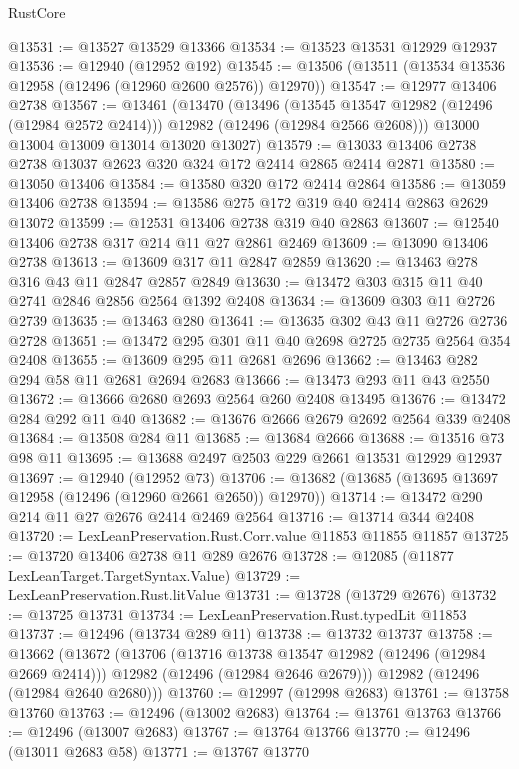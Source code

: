 \begin{lexlean}{RustCore}
\begin{coremodule}
@13531 := @13527 @13529 @13366
@13534 := @13523 @13531 @12929 @12937
@13536 := @12940 (@12952 @192)
@13545 := @13506 (@13511 (@13534 @13536 @12958 (@12496 (@12960 @2600 @2576)) @12970))
@13547 := @12977 @13406 @2738
@13567 := @13461
    (@13470
      (@13496
        (@13545 @13547 @12982 (@12496 (@12984 @2572 @2414)))
        @12982
        (@12496 (@12984 @2566 @2608)))
      @13000
      @13004
      @13009
      @13014
      @13020
      @13027)
@13579 := @13033 @13406 @2738 @2738 @13037 @2623 @320 @324 @172 @2414 @2865 @2414 @2871
@13580 := @13050 @13406
@13584 := @13580 @320 @172 @2414 @2864
@13586 := @13059 @13406 @2738
@13594 := @13586 @275 @172 @319 @40 @2414 @2863 @2629 @13072
@13599 := @12531 @13406 @2738 @319 @40 @2863
@13607 := @12540 @13406 @2738 @317 @214 @11 @27 @2861 @2469
@13609 := @13090 @13406 @2738
@13613 := @13609 @317 @11 @2847 @2859
@13620 := @13463 @278 @316 @43 @11 @2847 @2857 @2849
@13630 := @13472 @303 @315 @11 @40 @2741 @2846 @2856 @2564 @1392 @2408
@13634 := @13609 @303 @11 @2726 @2739
@13635 := @13463 @280
@13641 := @13635 @302 @43 @11 @2726 @2736 @2728
@13651 := @13472 @295 @301 @11 @40 @2698 @2725 @2735 @2564 @354 @2408
@13655 := @13609 @295 @11 @2681 @2696
@13662 := @13463 @282 @294 @58 @11 @2681 @2694 @2683
@13666 := @13473 @293 @11 @43 @2550
@13672 := @13666 @2680 @2693 @2564 @260 @2408 @13495
@13676 := @13472 @284 @292 @11 @40
@13682 := @13676 @2666 @2679 @2692 @2564 @339 @2408
@13684 := @13508 @284 @11
@13685 := @13684 @2666
@13688 := @13516 @73 @98 @11
@13695 := @13688 @2497 @2503 @229 @2661 @13531 @12929 @12937
@13697 := @12940 (@12952 @73)
@13706 := @13682 (@13685 (@13695 @13697 @12958 (@12496 (@12960 @2661 @2650)) @12970))
@13714 := @13472 @290 @214 @11 @27 @2676 @2414 @2469 @2564
@13716 := @13714 @344 @2408
@13720 := LexLeanPreservation.Rust.Corr.value @11853 @11855 @11857
@13725 := @13720 @13406 @2738 @11 @289 @2676
@13728 := @12085 (@11877 LexLeanTarget.TargetSyntax.Value)
@13729 := LexLeanPreservation.Rust.litValue
@13731 := @13728 (@13729 @2676)
@13732 := @13725 @13731
@13734 := LexLeanPreservation.Rust.typedLit @11853
@13737 := @12496 (@13734 @289 @11)
@13738 := @13732 @13737
@13758 := @13662
    (@13672
      (@13706
        (@13716 @13738 @13547 @12982 (@12496 (@12984 @2669 @2414)))
        @12982
        (@12496 (@12984 @2646 @2679)))
      @12982
      (@12496 (@12984 @2640 @2680)))
@13760 := @12997 (@12998 @2683)
@13761 := @13758 @13760
@13763 := @12496 (@13002 @2683)
@13764 := @13761 @13763
@13766 := @12496 (@13007 @2683)
@13767 := @13764 @13766
@13770 := @12496 (@13011 @2683 @58)
@13771 := @13767 @13770

\end{coremodule}
\end{lexlean}

